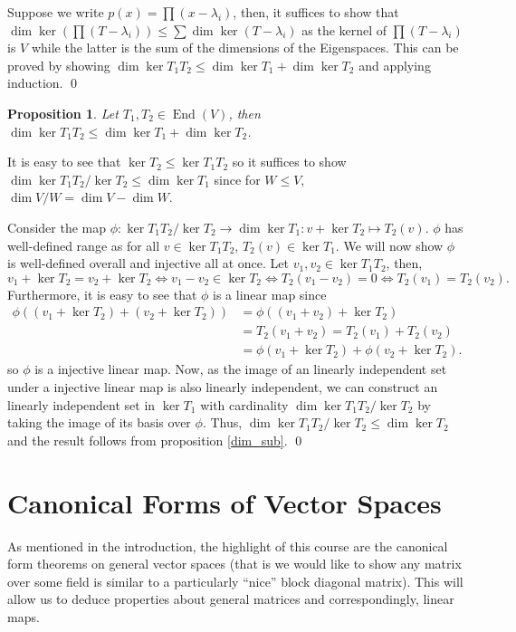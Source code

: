 \documentclass[
]{article}
\newtheorem{prop}{Proposition}[section]
\theoremstyle{definition}
\begin{document}
Suppose we write \(p(x) = \prod(x - \lambda_i)\), then, it suffices to
show that
\(\dim \ker (\prod(T - \lambda_i)) \le \sum \dim \ker(T - \lambda_i)\)
as the kernel of \(\prod(T - \lambda_i)\) is \(V\) while the latter is
the sum of the dimensions of the Eigenspaces. This can be proved by
showing \(\dim \ker T_1 T_2 \le \dim \ker T_1 + \dim \ker T_2\) and
applying induction. \qed

\begin{prop}
  Let \(T_1, T_2 \in \mathop{\mathrm{End}}(V)\), then 
  \(\dim \ker T_1 T_2 \le \dim \ker T_1 + \dim \ker T_2\).
\end{prop}
\proof

It is easy to see that \(\ker T_2 \le \ker T_1 T_2\) so it suffices to
show \(\dim \ker T_1 T_2 / \ker T_2 \le \dim \ker T_1\) since for
\(W \le V\), \(\dim V / W = \dim V - \dim W\).

Consider the map
\(\phi : \ker T_1 T_2 / \ker T_2 \to \dim \ker T_1 :  v + \ker T_2 \mapsto T_2(v)\).
\(\phi\) has well-defined range as for all \(v \in \ker T_1 T_2\),
\(T_2(v) \in \ker T_1\). We will now show \(\phi\) is well-defined
overall and injective all at once. Let \(v_1, v_2 \in \ker T_1 T_2\),
then,
\[v_1 + \ker T_2 = v_2 + \ker T_2 \iff v_1 - v_2 \in \ker T_2 \iff T_2 (v_1 - v_2) = 0
  \iff T_2(v_1) = T_2(v_2).\] Furthermore, it is easy to see that
\(\phi\) is a linear map since \begin{align*}
    \phi((v_1 + \ker T_2) + (v_2 + \ker T_2)) & = \phi((v_1 + v_2) + \ker T_2) \\
      & = T_2(v_1 + v_2) = T_2(v_1) + T_2(v_2) \\
      & = \phi(v_1 + \ker T_2) + \phi(v_2 + \ker T_2).
  \end{align*} so \(\phi\) is a injective linear map. Now, as the image
of an linearly independent set under a injective linear map is also
linearly independent, we can construct an linearly independent set in
\(\ker T_1\) with cardinality \(\dim \ker T_1 T_2 / \ker T_2\) by taking
the image of its basis over \(\phi\). Thus,
\(\dim \ker T_1 T_2 / \ker T_2 \le \dim \ker T_2\) and the result
follows from proposition \ref{dim_sub}. \qed

\hypertarget{canonical-forms-of-vector-spaces}{%
\section{Canonical Forms of Vector
Spaces}\label{canonical-forms-of-vector-spaces}}

As mentioned in the introduction, the highlight of this course are the
canonical form theorems on general vector spaces (that is we would like
to show any matrix over some field is similar to a particularly ``nice''
block diagonal matrix). This will allow us to deduce properties about
general matrices and correspondingly, linear maps.
\end{document}
